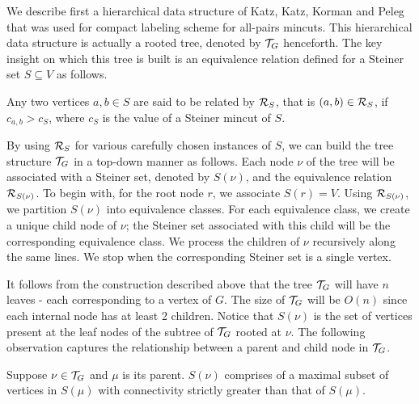We describe first a hierarchical data structure of Katz, Katz, Korman and Peleg \cite{DBLP:journals/siamcomp/KatzKKP04}
that was used for compact labeling scheme for all-pairs mincuts. This hierarchical data structure is actually a rooted tree, denoted by ${\cal T}_G$ henceforth. 
The key insight on which this tree is built is an equivalence relation defined for a Steiner set $S\subseteq V$ as follows.


\begin{definition}
Any two vertices $a,b\in S$ are said to be related by ${\cal R}_S$, that is $(a,b)\in {\cal R}_S$, if
$c_{a,b}>c_S$, where $c_S$ is the value of a Steiner mincut of $S$.
\end{definition}



By using ${\cal R}_S$ for various carefully chosen instances of $S$, we can build the tree structure ${\cal T}_G$ in a top-down manner as follows. Each node $\nu$ of the tree will be associated with a Steiner set, denoted by $S(\nu)$, and the equivalence relation ${\cal R}_{S(\nu)}$. To begin with, for the root node $r$, we associate $S(r)=V$.
Using ${\cal  R}_{S(\nu)}$, we partition $S(\nu)$ into equivalence classes. For each equivalence class, we create a unique child node of $\nu$; the Steiner set associated with this child will be the corresponding equivalence class. We process the children of $\nu$ recursively along the same lines. We stop when the corresponding Steiner set is a single vertex. 

It follows from the construction described above that the tree ${\cal T}_G$ will have $n$ leaves - each corresponding to a vertex of $G$. The size of ${\cal T}_G$ will be $O(n)$ since each internal node has at least 2 children. Notice that $S(\nu)$ is the set of vertices present at the leaf nodes of the subtree of ${\cal T}_G$ rooted at $\nu$. The following observation captures the relationship between a parent and child node in 
${\cal T}_G$.

\begin{observation}
\label{obs:maximal-subset-subtree}
Suppose $\nu \in {\cal T}_G$ and $\mu$ is its parent. $S(\nu)$ comprises of a maximal subset of vertices in $S(\mu)$ with connectivity strictly greater than that of $S(\mu)$.
\end{observation}

